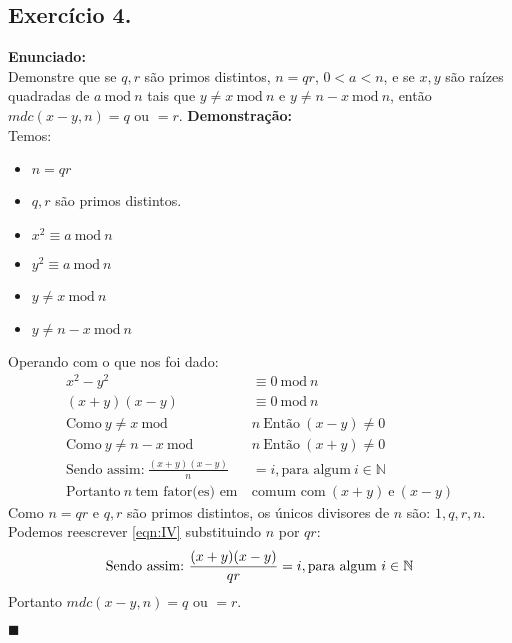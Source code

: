\documentclass[12pt]{article}
\newcommand{\bb}[1]{\mathbb{#1}}
\newcommand{\N}{\bb{N}}
\newcommand{\newqed}{{\hfill\color{black}\ensuremath{\blacksquare}}}
\begin{document}
\subsection*{Exercício 4.}
	\textbf{Enunciado:}\\
		Demonstre que se $q, r$ são primos distintos, $n = qr$, $0 < a < n$, 
		e se $x, y$ são raízes quadradas de $a \ \mathrm{mod} \ n$ tais que
		 $y \neq x \ \mathrm{mod} \ n$ e $y \neq n-x \ \mathrm{mod} \ n$, 
		 então $mdc(x-y, n) = q$ ou $= r$.
	\newline
	\newline
	\textbf{Demonstração:}\\
		Temos:
		\begin{itemize}
		\item
			$n = qr$
		\item
			$q, r$ são primos distintos.
		\item
			$x^2 \equiv a \ \mathrm{mod} \ n$
		\item
			$y^2 \equiv a \ \mathrm{mod} \ n$
		\item
			$y \neq x \ \mathrm{mod} \ n$
		\item
			$y \neq n-x \ \mathrm{mod} \ n$	
		\end{itemize}
		Operando com o que nos foi dado:
		\begin{align*}
			x^2 - y^2 &\equiv 0 \ \mathrm{mod} \ n\\
			(x+y)(x-y) &\equiv 0 \ \mathrm{mod} \ n\\
			\text{Como} \ y \neq x \ \mathrm{mod} \ &n \ 
			\text{Então} \ (x-y) \neq 0\\
			\text{Como} \ y \neq n-x \ \mathrm{mod} \ &n \ 
			\text{Então} \ (x+y) \neq 0\\
			\label{eqn:IV}\tag{I}
			\text{Sendo assim:} \ \frac{(x+y)(x-y)}{n} &= i, 
			\text{para algum} \  i \in \N\\
			\text{Portanto} \ n \ \text{tem fator(es) em} \ &
			\text{comum com} \ (x+y) \ \text{e} \ (x-y)
		\end{align*}
		Como $n = qr$ e $q, r$ são primos distintos, os únicos divisores de $n$ são:
		$1, q, r, n$.\\ 
		Podemos reescrever \eqref{eqn:IV} substituindo $n$ por $qr$:
		$$\text{Sendo assim:} \ \frac{(x+y)(x-y)}{qr} = i, 
		\text{para algum} \  i \in \N\\$$
		Portanto $mdc(x-y, n) = q$ ou $= r$.
			
		\newqed
\end{document}
